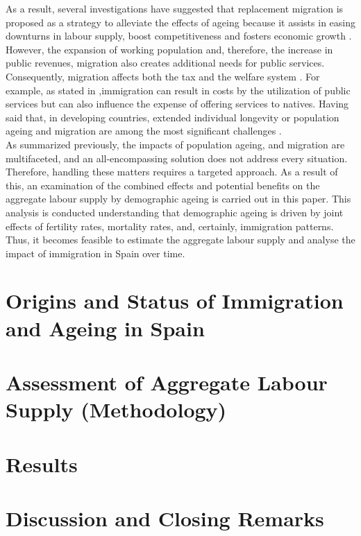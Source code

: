 \documentclass{article}
\begin{document}
As a result, several investigations have suggested that replacement migration is proposed as a strategy to alleviate the effects of ageing because it assists in easing downturns in labour supply, boost competitiveness and fosters economic growth \cite{stepanek2022sectoral, okamoto2021immigration, UNATIONS}. However, the expansion of working population and, therefore, the increase in public revenues, migration also creates additional needs for public services. Consequently, migration affects both the tax and the welfare system \cite{fiorio2023migration, naumann2021population}. For example, as stated in \cite{ preston2014effect},immigration can result in costs by the utilization of public services but can also influence the expense of offering services to natives. Having said that, in developing countries, extended individual longevity or population ageing and migration are among the most significant challenges \cite{ciobanu2020intersections}. \\

As summarized previously, the impacts of population ageing, and migration are multifaceted, and an all-encompassing solution does not address every situation. Therefore, handling these matters requires a targeted approach. As a result of this, an examination of the combined effects and potential benefits on the aggregate labour supply by demographic ageing is carried out in this paper. This analysis is conducted understanding that demographic ageing is driven by joint effects of fertility rates, mortality rates, and, certainly, immigration patterns. Thus, it becomes feasible to estimate the aggregate labour supply and analyse the impact of immigration in Spain over time. 



\section*{Origins and Status of Immigration and Ageing in Spain}


\section*{Assessment of Aggregate Labour Supply (Methodology)}


\section*{Results}

\section*{Discussion and Closing Remarks}



\end{document}

